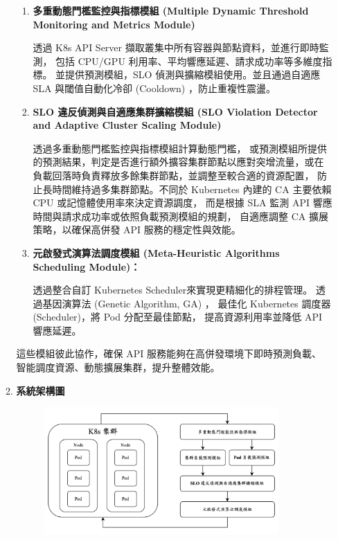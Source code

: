 \documentclass[12pt,a4paper]{article}
\begin{document}
\begin{enumerate}[label={(\zhdig*)}, leftmargin=2\parindent, listparindent=\parindent]
\begin{enumerate}[label={(\arabic*)}, leftmargin=\parindent, listparindent=\parindent]
\begin{enumerate}[label={(\zhdig*)}, leftmargin=\parindent, listparindent=\parindent]
    \item \textbf{多重動態門檻監控與指標模組 (Multiple Dynamic Threshold Monitoring and Metrics Module) }

        透過 K8s API Server 擷取叢集中所有容器與節點資料，並進行即時監測，
        包括 CPU/GPU 利用率、平均響應延遲、請求成功率等多維度指標。
        並提供預測模組，SLO 偵測與擴縮模組使用。並且通過自適應 SLA
        與閾值自動化冷卻 (Cooldown) ，防止重複性震盪。

    \item \textbf{SLO 違反偵測與自適應集群擴縮模組 (SLO Violation Detector and Adaptive Cluster Scaling Module) }

        透過多重動態門檻監控與指標模組計算動態門檻，
        或預測模組所提供的預測結果，判定是否進行額外擴容集群節點以應對突增流量，或在
        負載回落時負責釋放多餘集群節點，並調整至較合適的資源配置，
        防止長時間維持過多集群節點。不同於 Kubernetes
        內建的 CA 主要依賴 CPU 或記憶體使用率來決定資源調度\cite{19}，
        而是根據 SLA 監測 API 響應時間與請求成功率或依照負載預測模組的規劃，
        自適應調整 CA 擴展策略，以確保高併發 API 服務的穩定性與效能。

    \item \textbf{元啟發式演算法調度模組
            (Meta-Heuristic Algorithms Scheduling Module)：}

        透過整合自訂 Kubernetes Scheduler\cite{18}來實現更精細化的排程管理。
        透過基因演算法 (Genetic Algorithm, GA) ，
        最佳化 Kubernetes 調度器 (Scheduler)，將 Pod 分配至最佳節點，
        提高資源利用率並降低 API 響應延遲。

    \end{enumerate}

這些模組彼此協作，確保 API 服務能夠在高併發環境下即時預測負載、
智能調度資源、動態擴展集群，提升整體效能。

\item \textbf{
    系統架構圖}
\begin{figure} [htbp]

    \centering

\includegraphics[width=0.9\textwidth]{../figure/model.png}


\end{figure}
\end{enumerate}
\end{enumerate}
\end{document}
